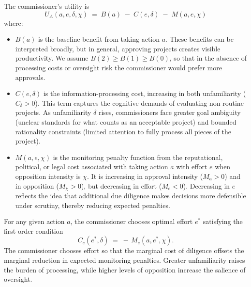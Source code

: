 The commissioner's utility is
\begin{equation}
    U_A(a,e,\delta,\chi) \;=\; B(a) \;-\; C(e,\delta) \;-\; M(a,e,\chi)
    \label{eq:agentutility}
\end{equation}
where:
\begin{itemize}
    \item $B(a)$ is the baseline benefit from taking action $a$. These benefits can be interpreted broadly, but in general, approving projects creates visible productivity. We assume $B(2)\geq B(1)\geq B(0)$, so that in the absence of processing costs or oversight risk the commissioner would prefer more approvals.
    \item $C(e,\delta)$ is the information-processing cost, increasing in both unfamiliarity ($C_\delta >0$). This term captures the cognitive demands of evaluating non-routine projects. As unfamiliarity $\delta$ rises, commissioners face greater goal ambiguity (unclear standards for what counts as an acceptable project) and bounded rationality constraints (limited attention to fully process all pieces of the project). 
    \item $M(a,e,\chi)$ is the monitoring penalty function from the reputational, political, or legal cost associated with taking action $a$ with effort $e$ when opposition intensity is $\chi$. It is increasing in approval intensity ($M_a > 0$) and in opposition ($M_\chi > 0$), but decreasing in effort ($M_e < 0$). Decreasing in $e$ reflects the idea that additional due diligence makes decisions more defensible under scrutiny, thereby reducing expected penalties.
\end{itemize}

For any given action $a$, the commissioner chooses optimal effort $e^*$ satisfying the first-order condition
\begin{equation}
    C_{e}(e^*,\delta) \;=\; -\, M_{e}(a,e^*,\chi).
    \label{eq:effortFOC}
\end{equation}
The commissioner chooses effort so that the marginal cost of diligence offsets the marginal reduction in expected monitoring penalties. Greater unfamiliarity raises the burden of processing, while higher levels of opposition increase the salience of oversight.

